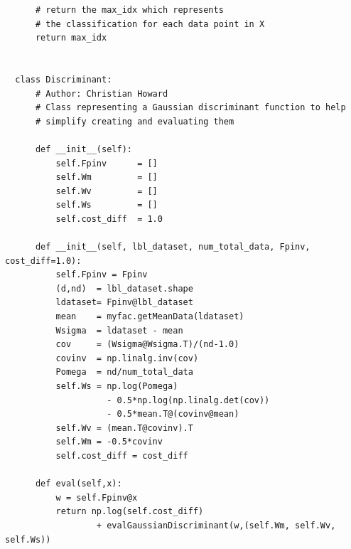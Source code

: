\documentclass{article}[12pt]
\begin{document}
\begin{verbatim}
      # return the max_idx which represents
      # the classification for each data point in X
      return max_idx


  class Discriminant:
      # Author: Christian Howard
      # Class representing a Gaussian discriminant function to help
      # simplify creating and evaluating them

      def __init__(self):
          self.Fpinv      = []
          self.Wm         = []
          self.Wv         = []
          self.Ws         = []
          self.cost_diff  = 1.0

      def __init__(self, lbl_dataset, num_total_data, Fpinv, cost_diff=1.0):
          self.Fpinv = Fpinv
          (d,nd)  = lbl_dataset.shape
          ldataset= Fpinv@lbl_dataset
          mean    = myfac.getMeanData(ldataset)
          Wsigma  = ldataset - mean
          cov     = (Wsigma@Wsigma.T)/(nd-1.0)
          covinv  = np.linalg.inv(cov)
          Pomega  = nd/num_total_data
          self.Ws = np.log(Pomega) 
                    - 0.5*np.log(np.linalg.det(cov)) 
                    - 0.5*mean.T@(covinv@mean)
          self.Wv = (mean.T@covinv).T
          self.Wm = -0.5*covinv
          self.cost_diff = cost_diff

      def eval(self,x):
          w = self.Fpinv@x
          return np.log(self.cost_diff) 
                  + evalGaussianDiscriminant(w,(self.Wm, self.Wv, self.Ws))
\end{verbatim}
\end{document}
